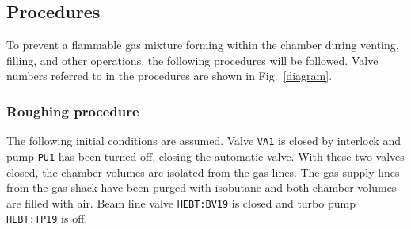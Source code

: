 \subsection{Procedures}
\label{procedures}
To prevent a flammable gas mixture forming within the chamber during venting, filling, and other operations,
the following procedures will be followed. Valve numbers referred to in the procedures are shown in Fig.~\ref{diagram}.
\subsubsection{Roughing procedure}
The following initial conditions are assumed.  Valve \texttt{VA1} is closed by interlock and pump \texttt{PU1} has been turned off, closing the automatic valve.  With these two valves closed, the chamber volumes are isolated from the gas lines.  The gas supply lines from the gas shack have been purged with isobutane and both chamber volumes are filled with air.  Beam line valve  \texttt{HEBT:BV19} is closed and turbo pump  \texttt{HEBT:TP19} is off. 

